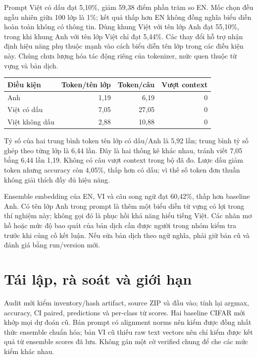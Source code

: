 \documentclass[11pt,a4paper]{article}
\begin{document}
Prompt Việt có dấu đạt 5,10\%, giảm 59,38 điểm phần trăm so EN. Mốc chọn đều ngẫu nhiên giữa 100 lớp là 1\%; kết quả thấp hơn EN không đồng nghĩa biểu diễn hoàn toàn không có thông tin. Dùng khung Việt với tên lớp Anh đạt 55,10\%, trong khi khung Anh với tên lớp Việt chỉ đạt 5,44\%. Các thay đổi hỗ trợ nhận định hiệu năng phụ thuộc mạnh vào cách biểu diễn tên lớp trong các điều kiện này. Chúng chưa lượng hóa tác động riêng của tokenizer, mức quen thuộc từ vựng và bản dịch.

\begin{center}\small
{}
\begin{tabular}{@{}lrrr@{}}\toprule
Điều kiện & Token/tên lớp & Token/câu & Vượt context\\\midrule
Anh & 1,19 & 6,19 & 0\\
Việt có dấu & 7,05 & 27,05 & 0\\
Việt không dấu & 2,88 & 10,88 & 0\\
\bottomrule\end{tabular}\end{center}

Tỷ số của hai trung bình token tên lớp có dấu/Anh là 5,92 lần; trung bình tỷ số ghép theo từng lớp là 6,44 lần. Đây là hai thống kê khác nhau, tránh viết 7,05 bằng 6,44 lần 1,19. Không có câu vượt context trong bộ đã đo. Lược dấu giảm token nhưng accuracy còn 4,05\%, thấp hơn có dấu; vì thế số token đơn thuần không giải thích đầy đủ hiệu năng.

Ensemble embedding của EN, VI và câu song ngữ đạt 60,42\%, thấp hơn baseline Anh. Có tên lớp Anh trong prompt là thêm một biểu diễn từ vựng có lợi trong thí nghiệm này; không gọi đó là phục hồi khả năng hiểu tiếng Việt. Các nhãn mơ hồ hoặc mức độ bao quát của bản dịch cần được người trong nhóm kiểm tra trước khi củng cố kết luận. Nếu sửa bản dịch theo ngữ nghĩa, phải giữ bản cũ và đánh giá bằng run/version mới.

\newpage
\section{Tái lập, rà soát và giới hạn}
Audit mới kiểm inventory/hash artifact, source ZIP và đầu vào; tính lại argmax, accuracy, CI paired, predictions và per-class từ scores. Hai baseline CIFAR mới khớp mọi dự đoán cũ. Bản prompt có alignment norms nên kiểm được đồng nhất thức ensemble chuẩn hóa; bản VI cũ thiếu raw text vectors nên chỉ kiểm được kết quả từ ensemble scores đã lưu. Không gán một cờ verified chung để che các mức kiểm khác nhau.
\end{document}
